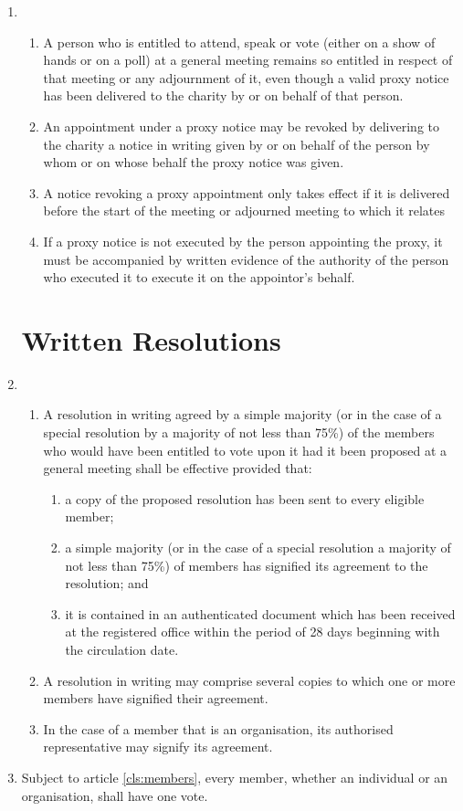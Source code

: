 \begin{enumerate}
\item
    \begin{enumerate}
        \item
        A person who is entitled to attend, speak or vote
        (either on a show of hands or on a poll) at a general meeting
        remains so entitled in respect of that meeting or any adjournment
        of it, even though a valid proxy notice has been delivered to the
        charity by or on behalf of that person.
        \item
        An appointment under a
        proxy notice may be revoked by delivering to the charity a notice
        in writing given by or on behalf of the person by whom or on whose
        behalf the proxy notice was given. 
        \item
        A notice revoking a proxy
        appointment only takes effect if it is delivered before the start
        of the meeting or adjourned meeting to which it relates 
        \item
        If a
        proxy notice is not executed by the person appointing the proxy, it
        must be accompanied by written evidence of the authority of the
        person who executed it to execute it on the appointor's behalf.
    \end{enumerate}

\section{Written Resolutions}

\item
  \begin{enumerate}
  \item
    A resolution in writing agreed by a simple majority (or in the case
    of a special resolution by a majority of not less than 75\%) of the
    members who would have been entitled to vote upon it had it been
    proposed at a general meeting shall be effective provided that:
    \begin{enumerate}
    \item
      a copy of the proposed resolution has been sent to every eligible
      member;
    \item
      a simple majority (or in the case of a special resolution a
      majority of not less than 75\%) of members has signified its
      agreement to the resolution; and
    \item
      it is contained in an authenticated document which has been
      received at the registered office within the period of 28 days
      beginning with the circulation date.
    \end{enumerate}
  \item
    A resolution in writing may comprise several copies to which one or
    more members have signified their agreement.
  \item
    In the case of a member that is an organisation, its authorised
    representative may signify its agreement.
  \end{enumerate}
\item
  Subject to article \ref{cls:members}, every member, whether an individual or an
  organisation, shall have one vote.


\end{enumerate}
